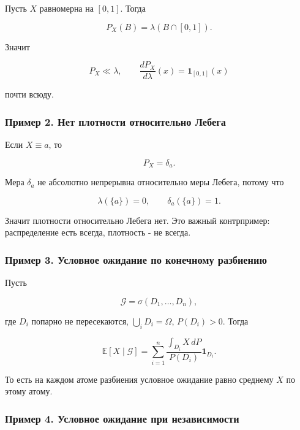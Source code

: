 \documentclass[
  11pt,
  a4paper,
]{article}
\begin{document}
Пусть \(X\) равномерна на \([0,1]\). Тогда

\[
P_X(B)=\lambda(B\cap[0,1]).
\]

Значит

\[
P_X\ll\lambda,
\qquad
\frac{dP_X}{d\lambda}(x)=\mathbf 1_{[0,1]}(x)
\]

почти всюду.

\subsubsection{Пример 2. Нет плотности относительно
Лебега}\label{ux43fux440ux438ux43cux435ux440-2.-ux43dux435ux442-ux43fux43bux43eux442ux43dux43eux441ux442ux438-ux43eux442ux43dux43eux441ux438ux442ux435ux43bux44cux43dux43e-ux43bux435ux431ux435ux433ux430}

Если \(X\equiv a\), то

\[
P_X=\delta_a.
\]

Мера \(\delta_a\) не абсолютно непрерывна относительно меры Лебега,
потому что

\[
\lambda(\{a\})=0,
\qquad
\delta_a(\{a\})=1.
\]

Значит плотности относительно Лебега нет. Это важный контрпример:
распределение есть всегда, плотность - не всегда.

\subsubsection{Пример 3. Условное ожидание по конечному
разбиению}\label{ux43fux440ux438ux43cux435ux440-3.-ux443ux441ux43bux43eux432ux43dux43eux435-ux43eux436ux438ux434ux430ux43dux438ux435-ux43fux43e-ux43aux43eux43dux435ux447ux43dux43eux43cux443-ux440ux430ux437ux431ux438ux435ux43dux438ux44e}

Пусть

\[
\mathcal G=\sigma(D_1,\ldots,D_n),
\]

где \(D_i\) попарно не пересекаются, \(\bigcup_iD_i=\Omega\),
\(P(D_i)>0\). Тогда

\[
\mathbb E[X\mid\mathcal G]
=
\sum_{i=1}^n
\frac{\int_{D_i}X\,dP}{P(D_i)}\mathbf 1_{D_i}.
\]

То есть на каждом атоме разбиения условное ожидание равно среднему \(X\)
по этому атому.

\subsubsection{Пример 4. Условное ожидание при
независимости}\label{ux43fux440ux438ux43cux435ux440-4.-ux443ux441ux43bux43eux432ux43dux43eux435-ux43eux436ux438ux434ux430ux43dux438ux435-ux43fux440ux438-ux43dux435ux437ux430ux432ux438ux441ux438ux43cux43eux441ux442ux438}
\end{document}
